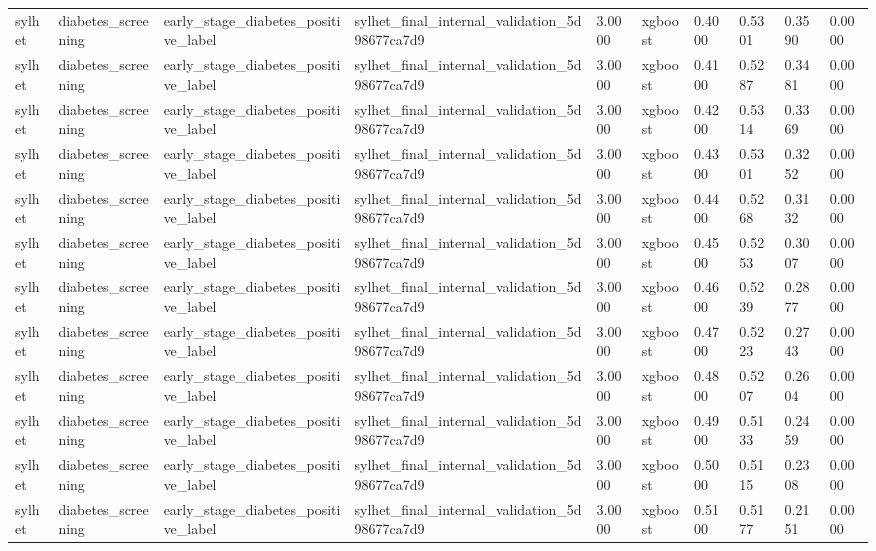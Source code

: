 \begin{tabular}{llllllllll}
sylhet & diabetes\_screening & early\_stage\_diabetes\_positive\_label & sylhet\_final\_internal\_validation\_5d98677ca7d9 & 3.0000 & xgboost & 0.4000 & 0.5301 & 0.3590 & 0.0000 \\
sylhet & diabetes\_screening & early\_stage\_diabetes\_positive\_label & sylhet\_final\_internal\_validation\_5d98677ca7d9 & 3.0000 & xgboost & 0.4100 & 0.5287 & 0.3481 & 0.0000 \\
sylhet & diabetes\_screening & early\_stage\_diabetes\_positive\_label & sylhet\_final\_internal\_validation\_5d98677ca7d9 & 3.0000 & xgboost & 0.4200 & 0.5314 & 0.3369 & 0.0000 \\
sylhet & diabetes\_screening & early\_stage\_diabetes\_positive\_label & sylhet\_final\_internal\_validation\_5d98677ca7d9 & 3.0000 & xgboost & 0.4300 & 0.5301 & 0.3252 & 0.0000 \\
sylhet & diabetes\_screening & early\_stage\_diabetes\_positive\_label & sylhet\_final\_internal\_validation\_5d98677ca7d9 & 3.0000 & xgboost & 0.4400 & 0.5268 & 0.3132 & 0.0000 \\
sylhet & diabetes\_screening & early\_stage\_diabetes\_positive\_label & sylhet\_final\_internal\_validation\_5d98677ca7d9 & 3.0000 & xgboost & 0.4500 & 0.5253 & 0.3007 & 0.0000 \\
sylhet & diabetes\_screening & early\_stage\_diabetes\_positive\_label & sylhet\_final\_internal\_validation\_5d98677ca7d9 & 3.0000 & xgboost & 0.4600 & 0.5239 & 0.2877 & 0.0000 \\
sylhet & diabetes\_screening & early\_stage\_diabetes\_positive\_label & sylhet\_final\_internal\_validation\_5d98677ca7d9 & 3.0000 & xgboost & 0.4700 & 0.5223 & 0.2743 & 0.0000 \\
sylhet & diabetes\_screening & early\_stage\_diabetes\_positive\_label & sylhet\_final\_internal\_validation\_5d98677ca7d9 & 3.0000 & xgboost & 0.4800 & 0.5207 & 0.2604 & 0.0000 \\
sylhet & diabetes\_screening & early\_stage\_diabetes\_positive\_label & sylhet\_final\_internal\_validation\_5d98677ca7d9 & 3.0000 & xgboost & 0.4900 & 0.5133 & 0.2459 & 0.0000 \\
sylhet & diabetes\_screening & early\_stage\_diabetes\_positive\_label & sylhet\_final\_internal\_validation\_5d98677ca7d9 & 3.0000 & xgboost & 0.5000 & 0.5115 & 0.2308 & 0.0000 \\
sylhet & diabetes\_screening & early\_stage\_diabetes\_positive\_label & sylhet\_final\_internal\_validation\_5d98677ca7d9 & 3.0000 & xgboost & 0.5100 & 0.5177 & 0.2151 & 0.0000 \\

\end{tabular}

